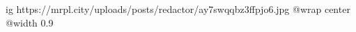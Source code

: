  
 
 
 
 

\ifcmt
  ig https://mrpl.city/uploads/posts/redactor/ay7swqqbz3ffpjo6.jpg
  @wrap center
  @width 0.9
\fi
